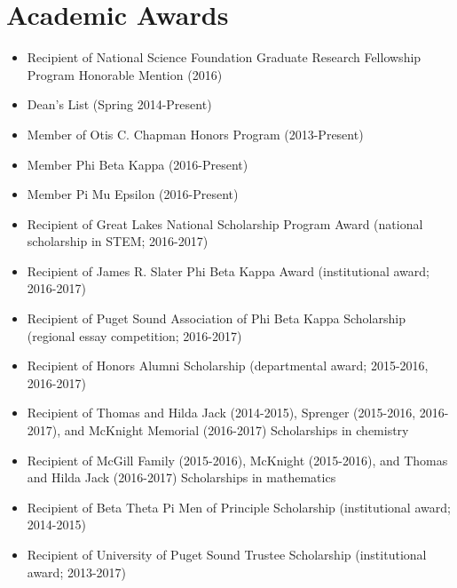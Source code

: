 \section{Academic Awards} 
 \begin{itemize}
 \item Recipient of National Science Foundation Graduate Research Fellowship Program Honorable Mention (2016)
 \item Dean's List (Spring 2014-Present)
 \item Member of Otis C. Chapman Honors Program (2013-Present)
 \item Member Phi Beta Kappa (2016-Present)
 \item Member Pi Mu Epsilon (2016-Present)
 \item Recipient of Great Lakes National Scholarship Program Award (national scholarship in STEM; 2016-2017)
 \item Recipient of James R. Slater Phi Beta Kappa Award (institutional award; 2016-2017)
 \item Recipient of Puget Sound Association of Phi Beta Kappa Scholarship (regional essay competition; 2016-2017)
 \item Recipient of Honors Alumni Scholarship (departmental award; 2015-2016, 2016-2017)
 \item Recipient of Thomas and Hilda Jack (2014-2015), Sprenger (2015-2016, 2016-2017), and McKnight Memorial (2016-2017) Scholarships in chemistry
 \item Recipient of McGill Family (2015-2016), McKnight (2015-2016), and Thomas and Hilda Jack (2016-2017) Scholarships in mathematics 
 \item Recipient of Beta Theta Pi Men of Principle Scholarship (institutional award; 2014-2015)
 \item Recipient of University of Puget Sound Trustee Scholarship (institutional award; 2013-2017)
 \end{itemize}
\vspace{-3.5mm}